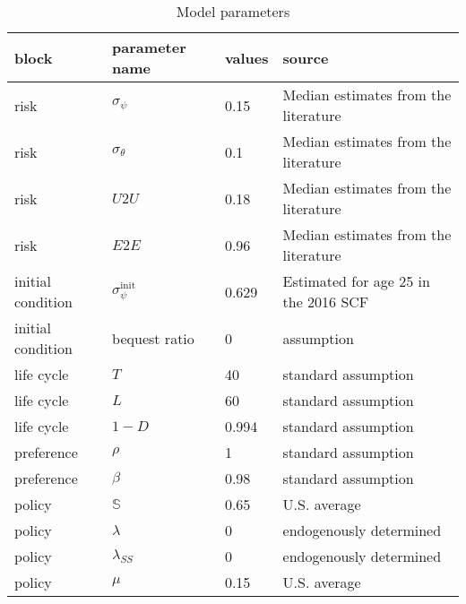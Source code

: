 \clearpage\begin{table}[p]
\begin{threeparttable}
\caption{Model parameters}
\label{tab:calibration}
\begin{tabular}{llll}
\hline 

block             & parameter name              & values & source                               \\
\hline 

risk              & $\sigma_\psi$               & 0.15   & Median estimates from the literature \\
risk              & $\sigma_\theta$             & 0.1    & Median estimates from the literature \\
risk              & $U2U$                       & 0.18   & Median estimates from the literature \\
risk              & $E2E$                       & 0.96   & Median estimates from the literature \\
\hline 

initial condition & $\sigma_\psi^{\text{init}}$ & 0.629  & Estimated for age 25 in the 2016 SCF \\
initial condition & bequest ratio               & 0      & assumption                           \\
\hline 

life cycle        & $T$                         & 40     & standard assumption                  \\
life cycle        & $L$                         & 60     & standard assumption                  \\
life cycle        & $1-D$                       & 0.994  & standard assumption                  \\
\hline 

preference        & $\rho$                      & 1      & standard assumption                  \\
preference        & $\beta$                     & 0.98   & standard assumption                  \\
\hline 

policy            & $\mathbb{S}$                & 0.65   & U.S. average                         \\
policy            & $\lambda$                   & 0      & endogenously determined              \\
policy            & $\lambda_{SS}$              & 0      & endogenously determined              \\
policy            & $\mu$                       & 0.15   & U.S. average                         \\
\hline 


\end{tabular}
\end{threeparttable}
\end{table}
